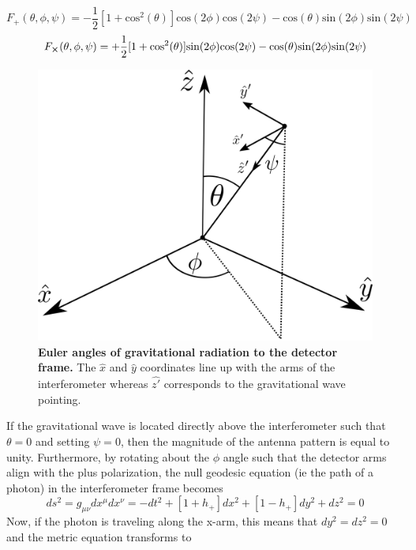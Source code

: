 	\begin{equation}\label{Fplus}
	F_{+}(\theta,\phi,\psi) = -\frac{1}{2}[1+\text{cos}^2(\theta)] \text{cos}(2\phi) \text{cos}(2\psi) - \text{cos}(\theta) \text{sin}(2\phi) \text{sin}(2\psi)
	\end{equation}
	\begin{equation}\label{Fcross}
	F_{\cross}(\theta,\phi,\psi) = + \frac{1}{2}[1+\text{cos}^2(\theta)] \text{sin}(2\phi) \text{cos}(2\psi) - \text{cos}(\theta) \text{sin}(2\phi) \text{sin}(2\psi)
	\end{equation}
	
	\begin{figure}[ht]
		\centering
		\includegraphics[width=.45 \textwidth]{../Figures/EulerAngles.png}
		\caption[Detector to radiation frame.]  
		{\textbf{Euler angles of gravitational radiation to the detector frame.}  The $\hat{x}$ and $\hat{y}$ coordinates line up with the arms of the interferometer whereas $\hat{z'}$ corresponds to the gravitational wave pointing. }
		\label{fig:euler}
	\end{figure}

	If the gravitational wave is located directly above the interferometer such that $\theta = 0$ and setting $\psi=0$, then the magnitude of the antenna pattern is equal to unity.  Furthermore, by rotating about the $\phi$ angle such that the detector arms align with the plus polarization, the null geodesic equation (ie the path of a photon) in the interferometer frame becomes 
	\begin{equation}
	ds^2 = g_{\mu\nu}dx^{\mu} dx^{\nu} = -dt^2 + [1+h_{+}]  dx^2 + [1-h_{+}]  dy^2 + dz^2 = 0
	\end{equation}
	Now, if the photon is traveling along the x-arm, this means that $dy^2 = dz^2 = 0$ and the metric equation transforms to
	
